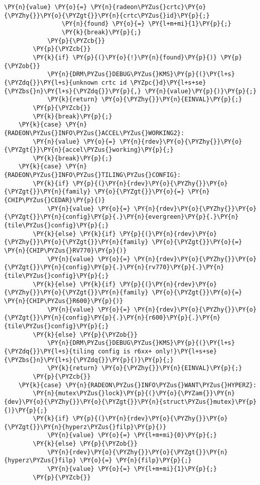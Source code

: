 \begin{Verbatim}[commandchars=\\\{\}]
				\PY{n}{value} \PY{o}{=} \PY{n}{radeon\PYZus{}crtc}\PY{o}{\PYZhy{}}\PY{o}{\PYZgt{}}\PY{n}{crtc\PYZus{}id}\PY{p}{;}
				\PY{n}{found} \PY{o}{=} \PY{l+m+mi}{1}\PY{p}{;}
				\PY{k}{break}\PY{p}{;}
			\PY{p}{\PYZcb{}}
		\PY{p}{\PYZcb{}}
		\PY{k}{if} \PY{p}{(}\PY{o}{!}\PY{n}{found}\PY{p}{)} \PY{p}{\PYZob{}}
			\PY{n}{DRM\PYZus{}DEBUG\PYZus{}KMS}\PY{p}{(}\PY{l+s}{\PYZdq{}}\PY{l+s}{unknown crtc id \PYZpc{}d}\PY{l+s+se}{\PYZbs{}n}\PY{l+s}{\PYZdq{}}\PY{p}{,} \PY{n}{value}\PY{p}{)}\PY{p}{;}
			\PY{k}{return} \PY{o}{\PYZhy{}}\PY{n}{EINVAL}\PY{p}{;}
		\PY{p}{\PYZcb{}}
		\PY{k}{break}\PY{p}{;}
	\PY{k}{case} \PY{n}{RADEON\PYZus{}INFO\PYZus{}ACCEL\PYZus{}WORKING2}:
		\PY{n}{value} \PY{o}{=} \PY{n}{rdev}\PY{o}{\PYZhy{}}\PY{o}{\PYZgt{}}\PY{n}{accel\PYZus{}working}\PY{p}{;}
		\PY{k}{break}\PY{p}{;}
	\PY{k}{case} \PY{n}{RADEON\PYZus{}INFO\PYZus{}TILING\PYZus{}CONFIG}:
		\PY{k}{if} \PY{p}{(}\PY{n}{rdev}\PY{o}{\PYZhy{}}\PY{o}{\PYZgt{}}\PY{n}{family} \PY{o}{\PYZgt{}}\PY{o}{=} \PY{n}{CHIP\PYZus{}CEDAR}\PY{p}{)}
			\PY{n}{value} \PY{o}{=} \PY{n}{rdev}\PY{o}{\PYZhy{}}\PY{o}{\PYZgt{}}\PY{n}{config}\PY{p}{.}\PY{n}{evergreen}\PY{p}{.}\PY{n}{tile\PYZus{}config}\PY{p}{;}
		\PY{k}{else} \PY{k}{if} \PY{p}{(}\PY{n}{rdev}\PY{o}{\PYZhy{}}\PY{o}{\PYZgt{}}\PY{n}{family} \PY{o}{\PYZgt{}}\PY{o}{=} \PY{n}{CHIP\PYZus{}RV770}\PY{p}{)}
			\PY{n}{value} \PY{o}{=} \PY{n}{rdev}\PY{o}{\PYZhy{}}\PY{o}{\PYZgt{}}\PY{n}{config}\PY{p}{.}\PY{n}{rv770}\PY{p}{.}\PY{n}{tile\PYZus{}config}\PY{p}{;}
		\PY{k}{else} \PY{k}{if} \PY{p}{(}\PY{n}{rdev}\PY{o}{\PYZhy{}}\PY{o}{\PYZgt{}}\PY{n}{family} \PY{o}{\PYZgt{}}\PY{o}{=} \PY{n}{CHIP\PYZus{}R600}\PY{p}{)}
			\PY{n}{value} \PY{o}{=} \PY{n}{rdev}\PY{o}{\PYZhy{}}\PY{o}{\PYZgt{}}\PY{n}{config}\PY{p}{.}\PY{n}{r600}\PY{p}{.}\PY{n}{tile\PYZus{}config}\PY{p}{;}
		\PY{k}{else} \PY{p}{\PYZob{}}
			\PY{n}{DRM\PYZus{}DEBUG\PYZus{}KMS}\PY{p}{(}\PY{l+s}{\PYZdq{}}\PY{l+s}{tiling config is r6xx+ only!}\PY{l+s+se}{\PYZbs{}n}\PY{l+s}{\PYZdq{}}\PY{p}{)}\PY{p}{;}
			\PY{k}{return} \PY{o}{\PYZhy{}}\PY{n}{EINVAL}\PY{p}{;}
		\PY{p}{\PYZcb{}}
	\PY{k}{case} \PY{n}{RADEON\PYZus{}INFO\PYZus{}WANT\PYZus{}HYPERZ}:
		\PY{n}{mutex\PYZus{}lock}\PY{p}{(}\PY{o}{\PYZam{}}\PY{n}{dev}\PY{o}{\PYZhy{}}\PY{o}{\PYZgt{}}\PY{n}{struct\PYZus{}mutex}\PY{p}{)}\PY{p}{;}
		\PY{k}{if} \PY{p}{(}\PY{n}{rdev}\PY{o}{\PYZhy{}}\PY{o}{\PYZgt{}}\PY{n}{hyperz\PYZus{}filp}\PY{p}{)}
			\PY{n}{value} \PY{o}{=} \PY{l+m+mi}{0}\PY{p}{;}
		\PY{k}{else} \PY{p}{\PYZob{}}
			\PY{n}{rdev}\PY{o}{\PYZhy{}}\PY{o}{\PYZgt{}}\PY{n}{hyperz\PYZus{}filp} \PY{o}{=} \PY{n}{filp}\PY{p}{;}
			\PY{n}{value} \PY{o}{=} \PY{l+m+mi}{1}\PY{p}{;}
		\PY{p}{\PYZcb{}}

\end{Verbatim}
